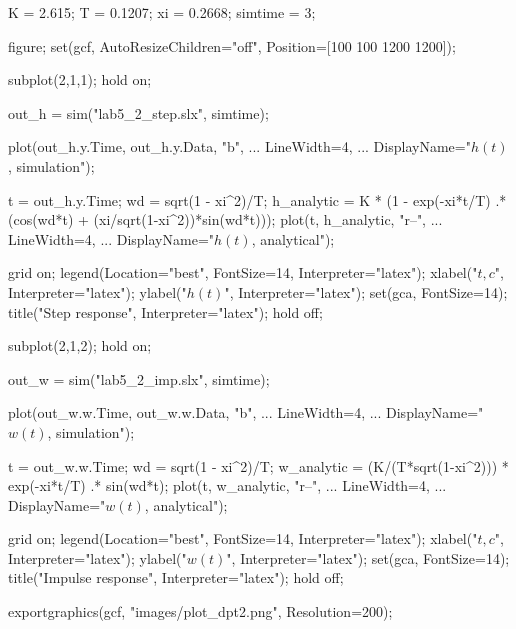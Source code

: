
\begin{matlabcode}
K = 2.615;
T = 0.1207;
xi = 0.2668;
simtime = 3;

figure;
set(gcf, AutoResizeChildren="off", Position=[100 100 1200 1200]);

subplot(2,1,1);
hold on;

out_h = sim("lab5_2_step.slx", simtime);

plot(out_h.y.Time, out_h.y.Data, "b", ...
     LineWidth=4, ...
     DisplayName="$h(t)$, simulation");

t = out_h.y.Time;
wd = sqrt(1 - xi^2)/T;
h_analytic = K * (1 - exp(-xi*t/T) .* (cos(wd*t) + (xi/sqrt(1-xi^2))*sin(wd*t)));
plot(t, h_analytic, "r--", ...
     LineWidth=4, ...
     DisplayName="$h(t)$, analytical");

grid on;
legend(Location="best", FontSize=14, Interpreter="latex");
xlabel("$t, c$", Interpreter="latex");
ylabel("$h(t)$", Interpreter="latex");
set(gca, FontSize=14);
title("Step response", Interpreter="latex");
hold off;

subplot(2,1,2);
hold on;

out_w = sim("lab5_2_imp.slx", simtime);

plot(out_w.w.Time, out_w.w.Data, "b", ...
     LineWidth=4, ...
     DisplayName="$w(t)$, simulation");

t = out_w.w.Time;
wd = sqrt(1 - xi^2)/T;
w_analytic = (K/(T*sqrt(1-xi^2))) * exp(-xi*t/T) .* sin(wd*t);
plot(t, w_analytic, "r--", ...
     LineWidth=4, ...
     DisplayName="$w(t)$, analytical");

grid on;
legend(Location="best", FontSize=14, Interpreter="latex");
xlabel("$t, c$", Interpreter="latex");
ylabel("$w(t)$", Interpreter="latex");
set(gca, FontSize=14);
title("Impulse response", Interpreter="latex");
hold off;

exportgraphics(gcf, "images/plot_dpt2.png", Resolution=200);
\end{matlabcode}


